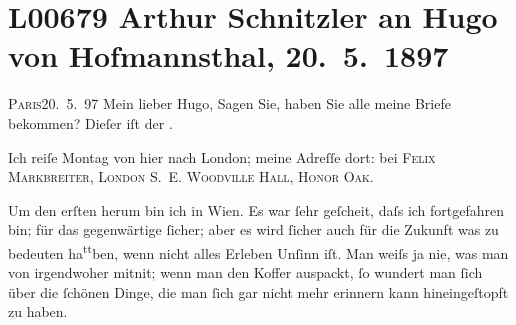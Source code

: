 

\section[Arthur Schnitzler an Hugo von Hofmannsthal, 20. 5. 1897]{L00679 Arthur Schnitzler an Hugo von Hofmannsthal, 20. 5. 1897}
\nopagebreak{}
\rehead{ }\normalsize\beginnumbering{}
\toendnotes[C]{\smallbreak\pagebreak[2]}
\toendnotes[C]{\smallbreak}
\pstart
           \raggedleft{}{\pb}\textsc{Paris}20. 5. 97\pend
           \vspace{0.5em}
\pstart
           Mein lieber Hugo, Sagen Sie, haben Sie alle meine Briefe bekommen?
               Dieſer iſt der \uline{\label{K_L00679-1v}\label{K_L00679-1}}.\pend
           
\pstart
           Ich reiſe Montag von hier nach London; meine
               Adreſſe dort: bei \textsc{Felix Markbreiter, London S. E. Woodville Hall, Honor Oak.}\pend
           
\pstart
           Um den erſten herum bin ich in Wien.
               Es war ſehr geſcheit, daſs ich fortgefahren bin; für {\pb}das
               gegenwärtige ſicher; aber es wird ſicher auch für die Zukunft was zu bedeuten ha\substVorne{}\textsuperscript{tt}\substDazwischen{}b\substHinten{}en, wenn nicht alles Erleben Unſinn iſt. Man weiſs ja nie, was man von
               irgendwoher mitni{\geminationm}t; wenn man den Koffer auspackt, ſo
               wundert man ſich über die ſchönen Dinge, die man ſich gar nicht mehr erinnern {\pb}kann hineingeſtopft zu haben.\pend
           
